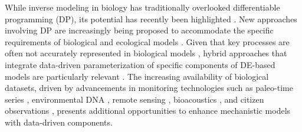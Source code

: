 While inverse modeling in biology has traditionally overlooked differentiable programming (DP), its potential has recently been highlighted \cite{frank2022, alsos2023}. New approaches involving DP are increasingly being proposed to accommodate the specific requirements of biological and ecological models \cite{Yazdani2020, Boussange2024, paredes2023}. Given that key processes are often not accurately represented in biological models \cite{hartig2012, Schartau2017, chalmandrier2021}, hybrid approaches that integrate data-driven parameterization of specific components of DE-based models are particularly relevant \cite{ramsay1996principal, cao2008estimating, paul2011semiparametric, chen2017network, rasp2018, dai2022kernel, Boussange2024}.
The increasing availability of biological datasets, driven by advancements in monitoring technologies such as paleo-time series \cite{alsos2023}, environmental DNA \cite{Ruppert2019}, remote sensing \cite{Jetz2019}, bioacoustics \cite{Aide2013}, and citizen observations \cite{GBIF}, presents additional opportunities to enhance mechanistic models with data-driven components.


